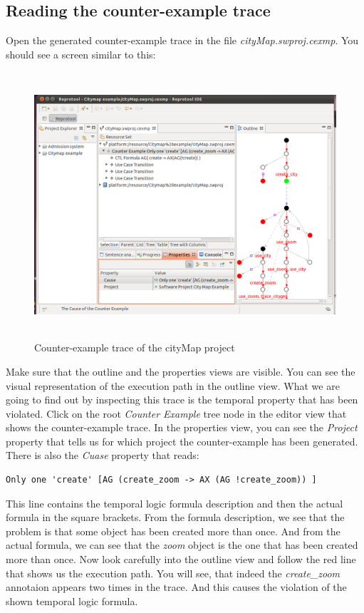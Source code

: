 \subsection{Reading the counter-example trace}
Open the generated counter-example trace in the file \emph{cityMap.swproj.cexmp}. You should see a screen similar to this:

\newpage

\begin{figure}[ht]
  \centering
  \includegraphics[height=280pt]{images/reprotoolTraceCityMap}
  \caption{Counter-example trace of the cityMap project}
  \label{fig:reprotoolTraceCityMap}
\end{figure}

Make sure that the outline and the properties views are visible. You can see the visual representation of the execution path in the
outline view. What we are going to find out by inspecting this trace is the temporal property that has been violated.
Click on the root \emph{Counter Example} tree node in the editor view that shows the counter-example trace. In the properties view,
you can see the \emph{Project} property that tells us for which project the counter-example has been generated. There is also the
\emph{Cuase} property that reads:
\begin{verbatim}
Only one 'create' [AG (create_zoom -> AX (AG !create_zoom)) ]
\end{verbatim}
This line contains the temporal logic formula description and then the actual formula in the square brackets. From the formula
description, we see that the problem is that some object has been created more than once. And from the actual formula, we can
see that the \emph{zoom} object is the one that has been created more than once. Now look carefully into the outline view and
follow the red line that shows us the execution path. You will see, that indeed the \emph{create\_zoom} annotaion appears two times
in the trace. And this causes the violation of the shown temporal logic formula.

